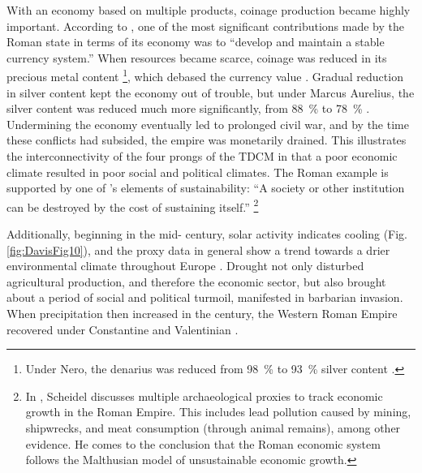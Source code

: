 

With an economy based on multiple products, coinage production became highly important. According to \textcite[49]{Kehoe_2013}, one of the most significant contributions made by the Roman state in terms of its economy was to “develop and maintain a stable currency system.” When resources became scarce, coinage was reduced in its precious metal content
\footnote{Under Nero, the denarius was reduced from \SI{98}{\percent} to \SI{93}{\percent} silver content \parencite[204]{Tainter_2014}.}, which debased the currency value \parencites[281]{Hichner_2009}[123--124]{Hopkins_1980}[274--275]{Ponting_2009}[204]{Tainter_2014}. Gradual reduction in silver content kept the economy out of trouble, but under Marcus Aurelius, the silver content was reduced much more significantly, from \SI{88}{\percent} to \SI{78}{\percent} \parencite[282]{Hichner_2009}. Undermining the economy eventually led to prolonged civil war, and by the time these conflicts had subsided, the empire was monetarily drained. This illustrates the interconnectivity of the four prongs of the TDCM in that a poor economic climate resulted in poor social and political climates. The Roman example is supported by one of \textcite[208]{Tainter_2014}'s elements of sustainability: “A society or other institution can be destroyed by the cost of sustaining itself.”
\footnote{In \textcite{Scheidel_2009b}, Scheidel discusses multiple archaeological proxies to track economic growth in the Roman Empire. This includes lead pollution caused by mining, shipwrecks, and meat consumption (through animal remains), among other evidence. He comes to the conclusion that the Roman economic system follows the Malthusian model of unsustainable economic growth.}

Additionally, beginning in the mid- century\AD, 
solar activity indicates cooling (Fig. \ref{fig:DavisFig10}), and the proxy data in general show a trend towards a drier environmental climate throughout Europe \parencite[185]{McCormick_2012}. Drought not only disturbed agricultural production, and therefore the economic sector, but also brought about a period of social and political turmoil, manifested in barbarian invasion. When precipitation then increased in the  century\AD, the Western Roman Empire recovered under Constantine and Valentinian \parencite[580]{Büntgen_2011a}.



